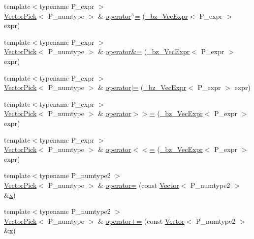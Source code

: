 \begin{DoxyCompactItemize}
{\footnotesize template$<$typename P\+\_\+expr $>$ }\\\hyperlink{classVectorPick}{Vector\+Pick}$<$ P\+\_\+numtype $>$ \& \hyperlink{classVectorPick_a7711b5b1e40594a118526f3612a863ba}{operator$^\wedge$=} (\hyperlink{class__bz__VecExpr}{\+\_\+bz\+\_\+\+Vec\+Expr}$<$ P\+\_\+expr $>$ expr)
\item 
{\footnotesize template$<$typename P\+\_\+expr $>$ }\\\hyperlink{classVectorPick}{Vector\+Pick}$<$ P\+\_\+numtype $>$ \& \hyperlink{classVectorPick_a0f8ccb9373e91779143d32aa77b41912}{operator\&=} (\hyperlink{class__bz__VecExpr}{\+\_\+bz\+\_\+\+Vec\+Expr}$<$ P\+\_\+expr $>$ expr)
\item 
{\footnotesize template$<$typename P\+\_\+expr $>$ }\\\hyperlink{classVectorPick}{Vector\+Pick}$<$ P\+\_\+numtype $>$ \& \hyperlink{classVectorPick_a0eb81b3413f25e601f474354997d21f6}{operator$\vert$=} (\hyperlink{class__bz__VecExpr}{\+\_\+bz\+\_\+\+Vec\+Expr}$<$ P\+\_\+expr $>$ expr)
\item 
{\footnotesize template$<$typename P\+\_\+expr $>$ }\\\hyperlink{classVectorPick}{Vector\+Pick}$<$ P\+\_\+numtype $>$ \& \hyperlink{classVectorPick_a9e46b414761e0f6d3d96d2a06ed84c36}{operator$>$$>$=} (\hyperlink{class__bz__VecExpr}{\+\_\+bz\+\_\+\+Vec\+Expr}$<$ P\+\_\+expr $>$ expr)
\item 
{\footnotesize template$<$typename P\+\_\+expr $>$ }\\\hyperlink{classVectorPick}{Vector\+Pick}$<$ P\+\_\+numtype $>$ \& \hyperlink{classVectorPick_ae226ce0afdf565fb0dfbc159a18e7640}{operator$<$$<$=} (\hyperlink{class__bz__VecExpr}{\+\_\+bz\+\_\+\+Vec\+Expr}$<$ P\+\_\+expr $>$ expr)
\item 
{\footnotesize template$<$typename P\+\_\+numtype2 $>$ }\\\hyperlink{classVectorPick}{Vector\+Pick}$<$ P\+\_\+numtype $>$ \& \hyperlink{classVectorPick_aa8c6308e9eb14235e364ac884e942811}{operator=} (const \hyperlink{classVector}{Vector}$<$ P\+\_\+numtype2 $>$ \&\hyperlink{vecnorm1_8cc_ac73eed9e41ec09d58f112f06c2d6cb63}{x})
\item 
{\footnotesize template$<$typename P\+\_\+numtype2 $>$ }\\\hyperlink{classVectorPick}{Vector\+Pick}$<$ P\+\_\+numtype $>$ \& \hyperlink{classVectorPick_af1080ecf7bdbc76005eebd872fcbfb57}{operator+=} (const \hyperlink{classVector}{Vector}$<$ P\+\_\+numtype2 $>$ \&\hyperlink{vecnorm1_8cc_ac73eed9e41ec09d58f112f06c2d6cb63}{x})

\end{DoxyCompactItemize}
